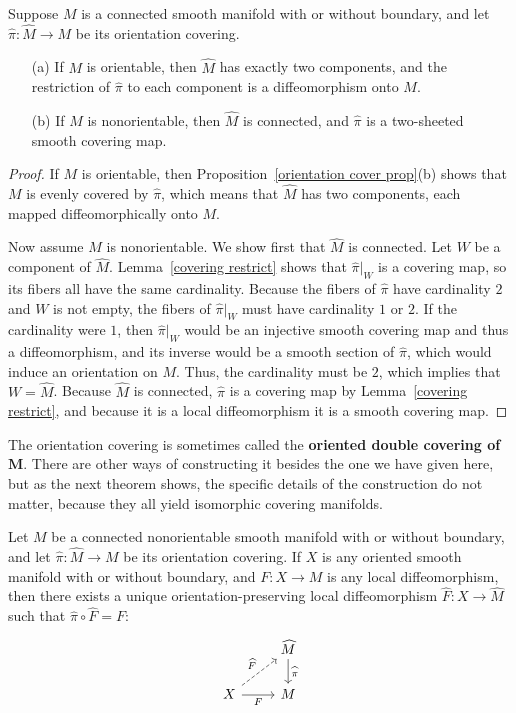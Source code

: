 \begin{theorem}
Suppose $M$ is a connected smooth manifold with or without boundary, and let $\widehat{\pi}:\widehat{M}\to M$ be its orientation covering.
\begin{itemize}
\item[(a)] If $M$ is orientable, then $\widehat{M}$ has exactly two components, and the restriction of $\widehat{\pi}$ to each component is a diffeomorphism onto $M$.
\item[(b)] If $M$ is nonorientable, then $\widehat{M}$ is connected, and $\widehat{\pi}$ is a two-sheeted smooth covering map.
\end{itemize}
\end{theorem}
\begin{proof}
If $M$ is orientable, then Proposition~\ref{orientation cover prop}(b) shows that $M$ is evenly covered by $\widehat{\pi}$, which means that $\widehat{M}$ has two components, each mapped diffeomorphically onto $M$.\par
Now assume $M$ is nonorientable. We show first that $\widehat{M}$ is connected. Let $W$ be a component of $\widehat{M}$. Lemma~\ref{covering restrict} shows that $\widehat{\pi}|_W$ is a covering map, so its fibers all have the same cardinality. Because the fibers of $\widehat{\pi}$ have cardinality $2$ and $W$ is not empty, the fibers of $\widehat{\pi}|_W$ must have cardinality $1$ or $2$. If the cardinality were $1$, then $\widehat{\pi}|_W$ would be an injective smooth covering map and thus a diffeomorphism, and its inverse would be a smooth section of $\widehat{\pi}$, which would induce an orientation on $M$. Thus, the cardinality must be $2$, which implies that $W=\widehat{M}$. Because $\widehat{M}$ is connected, $\widehat{\pi}$ is a covering map by Lemma~\ref{covering restrict}, and because it is a local diffeomorphism it is a smooth covering map.
\end{proof}
The orientation covering is sometimes called the \textbf{oriented double covering of $\bm{M}$}. There are other ways of constructing it besides the one we have given here, but as the next theorem shows, the specific details of the construction do not matter, because they all yield isomorphic covering manifolds.
\begin{theorem}\label{orientation cover char}
Let $M$ be a connected nonorientable smooth manifold with or without boundary, and let $\widehat{\pi}:\widehat{M}\to M$ be its orientation covering. If $X$ is any oriented smooth manifold with or without boundary, and $F:X\to M$ is any local diffeomorphism, then there exists a unique orientation-preserving local diffeomorphism $\widehat{F}:X\to\widehat{M}$ such that $\widehat{\pi}\circ\widehat{F}=F$:
\[\begin{tikzcd}
&\widehat{M}\ar[d,"\widehat{\pi}"]\\
X\ar[r,swap,"F"]\ar[ru,dashed,"\widehat{F}"]&M
\end{tikzcd}\]
\end{theorem}
